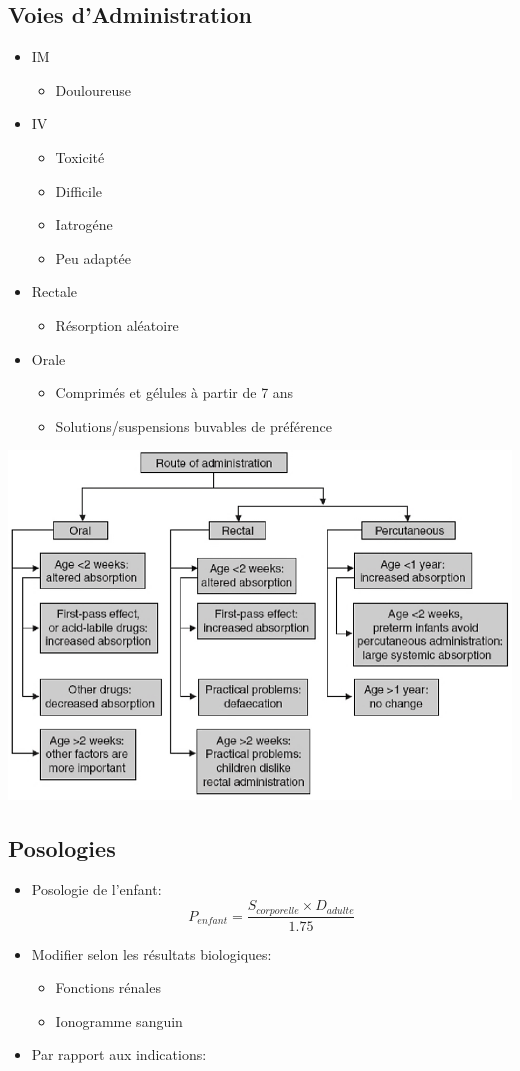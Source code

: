 \documentclass[11pt]{article}
\begin{document}
\subsection{Voies d'Administration}
\label{sec:orgea6546a}
\begin{itemize}
\item IM
\begin{itemize}
\item Douloureuse
\end{itemize}
\item IV
\begin{itemize}
\item Toxicité
\item Difficile
\item Iatrogéne
\item Peu adaptée
\end{itemize}
\item Rectale
\begin{itemize}
\item Résorption aléatoire
\end{itemize}
\item Orale
\begin{itemize}
\item Comprimés et gélules à partir de 7 ans
\item Solutions/suspensions buvables de préférence
\end{itemize}
\end{itemize}
\begin{center}
\includegraphics[width=.9\linewidth]{./pediatrie_administration.png}
\end{center}
\subsection{Posologies}
\label{sec:org500515d}
\begin{itemize}
\item Posologie de l'enfant:
\[
  P_{enfant} = \frac{ S_{corporelle} \times D_{adulte} }{1.75}
  \]
\item Modifier selon les résultats biologiques:
\begin{itemize}
\item Fonctions rénales
\item Ionogramme sanguin
\end{itemize}
\item Par rapport aux indications:
\end{itemize}
\end{document}
